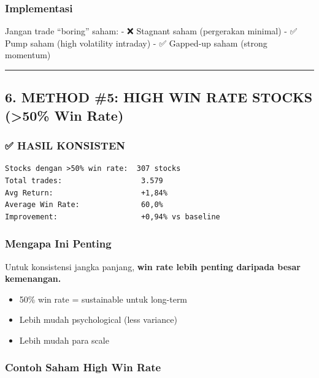 \documentclass[
  10pt,
  a4paper,
]{article}
\providecommand{\tightlist}{%
  \setlength{\itemsep}{0pt}\setlength{\parskip}{0pt}}\usepackage{longtable,booktabs,array}
\begin{document}
\subsubsection{Implementasi}\label{implementasi}

Jangan trade ``boring'' saham: - ❌ Stagnant saham (pergerakan minimal)
- ✅ Pump saham (high volatility intraday) - ✅ Gapped-up saham (strong
momentum)

\begin{center}\rule{0.5\linewidth}{0.5pt}\end{center}

\subsection{6. METHOD \#5: HIGH WIN RATE STOCKS (\textgreater50\% Win
Rate)}\label{method-5-high-win-rate-stocks-50-win-rate}

\subsubsection{✅ HASIL KONSISTEN}\label{hasil-konsisten}

\begin{verbatim}
Stocks dengan >50% win rate:  307 stocks
Total trades:                  3.579
Avg Return:                    +1,84%
Average Win Rate:              60,0%
Improvement:                   +0,94% vs baseline
\end{verbatim}

\subsubsection{Mengapa Ini Penting}\label{mengapa-ini-penting}

Untuk konsistensi jangka panjang, \textbf{win rate lebih penting
daripada besar kemenangan.}

\begin{itemize}
\tightlist
\item
  50\% win rate = sustainable untuk long-term
\item
  Lebih mudah psychological (less variance)
\item
  Lebih mudah para scale
\end{itemize}

\subsubsection{Contoh Saham High Win
Rate}\label{contoh-saham-high-win-rate}
\end{document}
